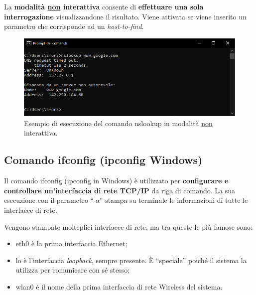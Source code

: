 \documentclass[a4paper]{article}
\newcommand{\dquotes}[1]{``#1''}
\begin{document}
	\noindent
	La \textbf{modalità \underline{non} interattiva} consente di \textbf{effettuare una sola interrogazione} visualizzandone il risultato. Viene attivata se viene inserito un parametro che corrisponde ad un \emph{host-to-find}.
	
	\begin{figure}[!htp]
		\centering
		\includegraphics[width=\textwidth]{img/altri-strumenti/nslookup2.png}
		\caption{Esempio di esecuzione del comando \textsf{nslookup} in modalità \underline{non} interattiva.}
	\end{figure}\newpage
	
	\subsection{Comando \textsf{ifconfig} (\textsf{ipconfig} Windows)}
	
	Il comando \textcolor{Red3}{\textsf{ifconfig}} (\textsf{ipconfig} in Windows) è utilizzato per \textbf{configurare e controllare un'interfaccia di rete TCP/IP} da riga di comando. La sua esecuzione con il parametro \dquotes{\textsf{-a}} stampa su terminale le informazioni di tutte le interfacce di rete.\newline
	
	\noindent
	Vengono stampate molteplici interfacce di rete, ma tra queste le più famose sono:
	\begin{itemize}
		\item \textsf{eth0} è la prima interfaccia Ethernet;
		
		\item \textsf{lo} è l'interfaccia \emph{loopback}, sempre presente. È \dquotes{speciale} poiché il sistema la utilizza per comunicare con sé stesso;
		
		\item \textsf{wlan0} è il nome della prima interfaccia di rete Wireless del sistema.
	\end{itemize}
	
\end{document}
